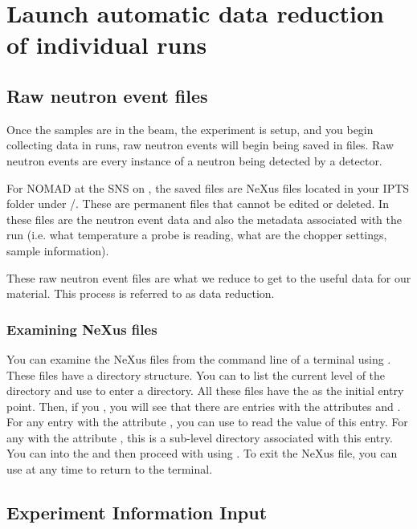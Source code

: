 \section{Launch automatic data reduction of individual runs}


\subsection{Raw neutron event files}
Once the samples are in the beam, the experiment is setup, and you begin collecting data in runs, raw neutron events will begin being saved in files. Raw neutron events are every instance of a neutron being detected by a detector. 

For NOMAD at the SNS on \analysis, the saved files are NeXus files located in your IPTS folder under \iptsPrint/. These are permanent files that cannot be edited or deleted. In these files are the neutron event data and also the metadata associated with the run (i.e. what temperature a probe is reading, what are the chopper settings, sample information). 

These raw neutron event files are what we reduce to get to the useful data for our material. This process is referred to as data reduction.

\subsubsection{Examining NeXus files}

You can examine the NeXus files from the command line of a terminal using . These files have a directory structure. You can  to list the current level of the directory and use  to enter a directory. All these files have the  as the initial entry point. Then, if you , you will see that there are entries with the attributes  and . For any entry with the attribute , you can use  to read the value of this entry. For any with the attribute , this is a sub-level directory associated with this entry. You can  into the  and then proceed with using . To exit the NeXus file, you can use  at any time to return to the terminal.



\subsection{Experiment Information Input}


